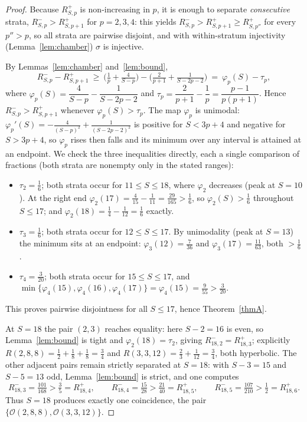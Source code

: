 \documentclass[12pt, letterpaper]{article}
\theoremstyle{definition}
\theoremstyle{plain}
\begin{document}
\begin{proof}
Because $R^{+}_{S,p}$ is non-increasing in $p$, it is enough to separate \emph{consecutive} strata, $R^{-}_{S,p}>R^{+}_{S,p+1}$ for $p=2,3,4$: this yields $R^{-}_{S,p}>R^{+}_{S,p+1}\ge R^{+}_{S,p''}$ for every $p''>p$, so all strata are pairwise disjoint, and with within-stratum injectivity (Lemma~\ref{lem:chamber}) $\sigma$ is injective.

By Lemmas~\ref{lem:chamber} and~\ref{lem:bound},
\[
    R^{-}_{S,p}-R^{+}_{S,p+1}\ \ge\ \Big(\tfrac1p+\tfrac4{S-p}\Big)-\Big(\tfrac2{p+1}+\tfrac1{S-2p-2}\Big)\ =\ \varphi_p(S)-\tau_p,
\]
where $\varphi_p(S)=\dfrac4{S-p}-\dfrac1{S-2p-2}$ and $\tau_p=\dfrac2{p+1}-\dfrac1p=\dfrac{p-1}{p(p+1)}$. Hence $R^{-}_{S,p}>R^{+}_{S,p+1}$ whenever $\varphi_p(S)>\tau_p$. The map $\varphi_p$ is unimodal: $\varphi_p'(S)=-\tfrac4{(S-p)^2}+\tfrac1{(S-2p-2)^2}$ is positive for $S<3p+4$ and negative for $S>3p+4$, so $\varphi_p$ rises then falls and its minimum over any interval is attained at an endpoint. We check the three inequalities directly, each a single comparison of fractions (both strata are nonempty only in the stated ranges):
\begin{itemize}
\item[$(p=2)$:] $\tau_2=\tfrac16$; both strata occur for $11\le S\le18$, where $\varphi_2$ decreases (peak at $S=10$). At the right end $\varphi_2(17)=\tfrac4{15}-\tfrac1{11}=\tfrac{29}{165}>\tfrac16$, so $\varphi_2(S)>\tfrac16$ throughout $S\le17$; and $\varphi_2(18)=\tfrac14-\tfrac1{12}=\tfrac16$ exactly.
\item[$(p=3)$:] $\tau_3=\tfrac16$; both strata occur for $12\le S\le17$. By unimodality (peak at $S=13$) the minimum sits at an endpoint: $\varphi_3(12)=\tfrac7{36}$ and $\varphi_3(17)=\tfrac{11}{63}$, both $>\tfrac16$.
\item[$(p=4)$:] $\tau_4=\tfrac3{20}$; both strata occur for $15\le S\le17$, and $\min\{\varphi_4(15),\varphi_4(16),\varphi_4(17)\}=\varphi_4(15)=\tfrac9{55}>\tfrac3{20}$.
\end{itemize}
This proves pairwise disjointness for all $S\le17$, hence Theorem~\ref{thmA}.

At $S=18$ the pair $(2,3)$ reaches equality: here $S-2=16$ is even, so Lemma~\ref{lem:bound} is tight and $\varphi_2(18)=\tau_2$, giving $R^{-}_{18,2}=R^{+}_{18,3}$; explicitly $R(2,8,8)=\tfrac12+\tfrac18+\tfrac18=\tfrac34$ and $R(3,3,12)=\tfrac23+\tfrac1{12}=\tfrac34$, both hyperbolic. The other adjacent pairs remain strictly separated at $S=18$: with $S-3=15$ and $S-5=13$ odd, Lemma~\ref{lem:bound} is strict, and one computes
\[
    R^{-}_{18,3}=\tfrac{101}{168}>\tfrac35=R^{+}_{18,4},\qquad
    R^{-}_{18,4}=\tfrac{15}{28}>\tfrac{21}{40}=R^{+}_{18,5},\qquad
    R^{-}_{18,5}=\tfrac{107}{210}>\tfrac12=R^{+}_{18,6}.
\]
Thus $S=18$ produces exactly one coincidence, the pair $\{\mathcal{O}(2,8,8),\mathcal{O}(3,3,12)\}$.
\end{proof}
\end{document}
